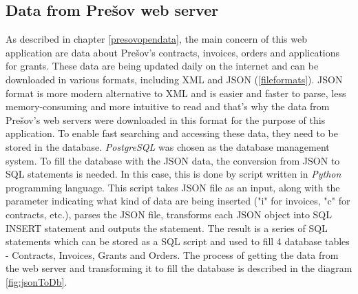 \documentclass[thesis=B,english]{FITthesis}[2012/06/26]
\begin{document}
	\subsection{Data from Prešov web server}
	As described in chapter \ref{presovopendata}, the main concern of this web application are data about Prešov's contracts, invoices, orders and applications for grants. These data are being updated daily on the internet and can be downloaded in various formats, including XML and JSON (\ref{fileformats}). JSON format is more modern alternative to XML and is easier and faster to parse, less memory-consuming and more intuitive to read and that's why the data from Prešov's web servers were downloaded in this format for the purpose of this application. To enable fast searching and accessing these data, they need to be stored in the database. \textit{PostgreSQL} was chosen as the database management system. To fill the database with the JSON data, the conversion from JSON to SQL statements is needed. In this case, this is done by script written in \textit{Python} programming language. This script takes JSON file as an input, along with the parameter indicating what kind of data are being inserted ("i" for invoices, "c" for contracts, etc.), parses the JSON file, transforms each JSON object into SQL INSERT statement and outputs the statement. The result is a series of SQL statements which can be stored as a SQL script and used to fill 4 database tables - Contracts, Invoices, Grants and Orders. The process of getting the data from the web server and transforming it to fill the database is described in the diagram \ref{fig:jsonToDb}.
\end{document}
